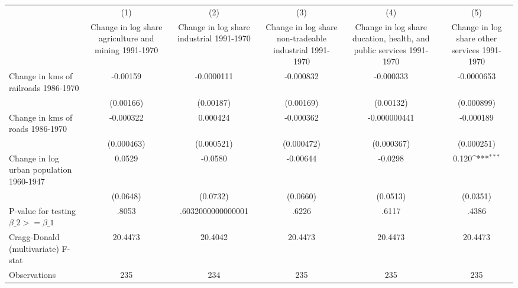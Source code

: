 {
\def\sym#1{\ifmmode^{#1}\else\(^{#1}\)\fi}
\begin{tabular}{l*{5}{c}}
\hline\hline
                &\multicolumn{1}{c}{(1)}&\multicolumn{1}{c}{(2)}&\multicolumn{1}{c}{(3)}&\multicolumn{1}{c}{(4)}&\multicolumn{1}{c}{(5)}\\
                &\multicolumn{1}{c}{Change in log share agriculture and mining 1991-1970}&\multicolumn{1}{c}{Change in log share industrial 1991-1970}&\multicolumn{1}{c}{Change in log share non-tradeable industrial 1991-1970}&\multicolumn{1}{c}{Change in log share ducation, health, and public services 1991-1970}&\multicolumn{1}{c}{Change in log share other services 1991-1970}\\
\hline
Change in kms of railroads 1986-1970& -0.00159         &-0.0000111         &-0.000832         &-0.000333         &-0.0000653         \\
                &(0.00166)         &(0.00187)         &(0.00169)         &(0.00132)         &(0.000899)         \\
[1em]
Change in kms of roads 1986-1970&-0.000322         & 0.000424         &-0.000362         &-0.000000441         &-0.000189         \\
                &(0.000463)         &(0.000521)         &(0.000472)         &(0.000367)         &(0.000251)         \\
[1em]
Change in log urban population 1960-1947&   0.0529         &  -0.0580         & -0.00644         &  -0.0298         &    0.120\sym{***}\\
                & (0.0648)         & (0.0732)         & (0.0660)         & (0.0513)         & (0.0351)         \\
\hline
P-value for testing $\beta\_{2} >= \beta\_{1}$&    .8053         &.6032000000000001         &    .6226         &    .6117         &    .4386         \\
Cragg-Donald (multivariate) F-stat&  20.4473         &  20.4042         &  20.4473         &  20.4473         &  20.4473         \\
Observations    &      235         &      234         &      235         &      235         &      235         \\
\hline\hline
\end{tabular}
}
